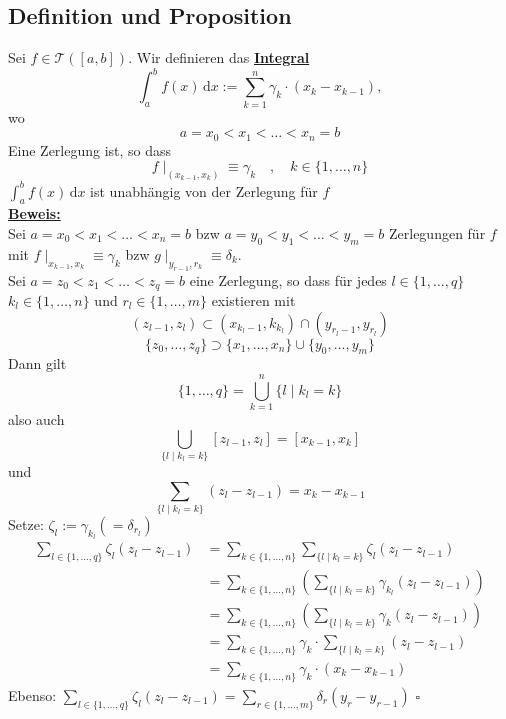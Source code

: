\subsection{Definition und Proposition} %
\label{sub:definition_und_proposition}
Sei $f \in \mathcal{T} ([a,b])$. Wir definieren das \underline{\textbf{Integral}} 
\[
	\int_{a}^{b}\! f(x) \, \mathrm{d}  x := \sum\limits_{k=1}^{n} \gamma_k \cdot (x_k - x_{k-1}), 
\]
wo
\[
	a= x_0 < x_1 < \ldots < x_n = b
\]
Eine Zerlegung ist, so dass
\[
	f\mid_{(x_{k-1}, x_k)} \equiv \gamma_k \quad , \quad k \in \{ 1, \ldots , n \} 
\]
$\int_{a}^{b} \! f(x) \, \mathrm{d} x$ ist unabhängig von der Zerlegung für $f$
\vspace{\baselineskip} \\
\underline{\textbf{Beweis:}} \\
Sei $a= x_0 < x_1 < \ldots < x_n = b$ bzw $a=y_0 < y_1  < \ldots < y_m= b$ Zerlegungen für $f$ mit $f \mid_{x_{k-1}, x_k} \equiv \gamma_k$ bzw
$g \mid_{y_{r-1}, r_k} \equiv \delta_k$. \\
Sei $a=z_0 < z_1 < \ldots < z_q = b$ eine Zerlegung, so dass für jedes $l \in \{ 1, \ldots , q\}$  $k_l \in \{ 1, \ldots , n \}$ und
$ r_l \in \{1, \ldots , m \}$ existieren mit 
\[
	(z_{l-1}, z_l) \subset (x_{k_l -1}, k_{k_l}) \cap (y_{r_l-1}, y_{r_l})
\]
\[
	\{z_0 , \ldots , z_q\} \supset \{x_1, \ldots , x_n\} \cup \{y_0, \ldots , y_m\}
\]
Dann gilt
\[
	\{1, \ldots , q \} = \bigcup_{k=1}^{n}\{l \mid k_l =k \}
\]
also auch
\[
	\bigcup_{\{l \mid k_l = k \} } [z_{l-1}, z_l] = [x_{k-1}, x_k]
\]
und
\[
	\sum\limits_{\{l \mid k_l =k \} } (z_l - z_{l-1}) = x_k - x_{k-1} \tag{warum?}
\]
Setze: $\zeta_l := \gamma_{k_l} (= \delta_{r_l})$
\begin{align*}
	\sum\limits_{l \in \{1, \ldots , q \} } \zeta_l (z_l - z_{l-1}) &= \sum\limits_{k \in \{1, \ldots , n \} } \sum\limits_{ \{l \mid k_l = k \} } 
	\zeta_l (z_l - z_{l-1})  \\
	&= \sum\limits_{k \in \{1, \ldots , n \} } \left( \sum\limits_{ \{l \mid k_l = k \} } \gamma_{k_l} (z_{l} - z_{l-1})\right) \\
	&= \sum\limits_{k \in \{1, \ldots , n \} } \left( \sum\limits_{ \{l \mid k_l = k \} } \gamma_{k} (z_{l} - z_{l-1})\right) \\
	&= \sum\limits_{k \in \{1, \ldots , n \} } \gamma_k \cdot  \sum\limits_{ \{l \mid k_l = k \} } (z_{l} - z_{l-1})\\
	&= \sum\limits_{k \in \{1, \ldots , n \} } \gamma_k \cdot  (x_k - x_{k-1})
\end{align*}
Ebenso: $\sum\limits_{l \in \{1, \ldots , q \} } \zeta_l (z_l -z_{l-1}) = \sum\limits_{r \in \{1, \ldots , m \} } \delta_r ( y_r - y_{r-1})$ \hfill \( \square \)

